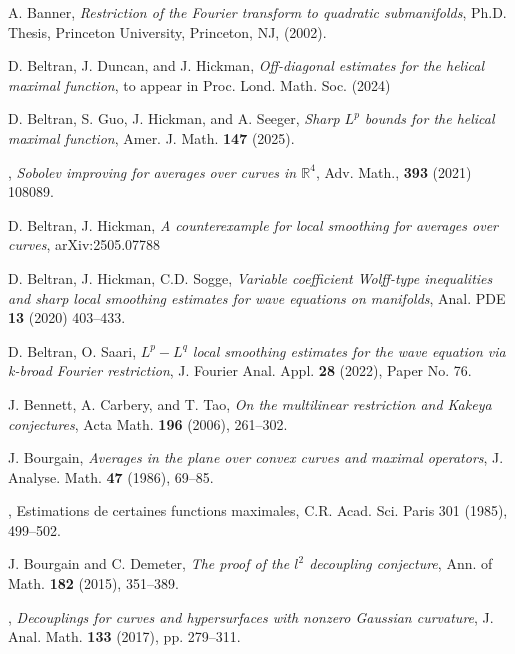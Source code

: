 \documentclass[10pt] %
{amsart}
\theoremstyle{plain}
\numberwithin{equation}{section}
\begin{document}

\begin{thebibliography}{}  


 A. Banner, \textit{Restriction of the Fourier transform to quadratic submanifolds}, Ph.D. Thesis, Princeton University, Princeton, NJ, (2002). 

 D. Beltran, J. Duncan, and J. Hickman, 
\textit{Off-diagonal estimates for the helical maximal function}, to appear in Proc. Lond. Math. Soc. (2024)  

 D. Beltran, S. Guo, J. Hickman, and A. Seeger,
\textit{Sharp $L^p$ bounds for the helical maximal function},
Amer. J. Math. \textbf{147} (2025).

 \bysame, \textit{Sobolev improving for averages over curves in $\mathbb R^4$}, Adv. Math., {\bf 393}  (2021)  108089.

 D. Beltran, J. Hickman, \textit{A counterexample for local smoothing for averages over curves}, arXiv:2505.07788


 D. Beltran, J. Hickman, C.D. Sogge, \textit{Variable coefficient Wolff-type inequalities and sharp local smoothing estimates for wave equations on manifolds}, Anal. PDE {\bf 13} (2020) 403--433.

 D. Beltran, O. Saari, \textit{$L^p-L^q$ local smoothing estimates for the wave equation via k-broad Fourier restriction}, J. Fourier Anal. Appl. \textbf{28} (2022), Paper No. 76.



 J. Bennett, A. Carbery, and T. Tao, \textit{On the multilinear restriction and Kakeya conjectures}, Acta Math. \textbf{196} (2006), 261--302.
	

	
 J. Bourgain, \textit{Averages in the plane over convex curves and maximal operators}, J. Analyse. Math. {\bf 47} (1986), 69--85.


		
 \bysame, Estimations de certaines functions maximales, C.R. Acad. Sci. Paris 301
(1985), 499--502.  

 J. Bourgain and C. Demeter, \textit{The proof of the $l^2$ decoupling conjecture},  Ann. of Math.  {\bf 182} (2015),  351--389.
		
 \bysame,  \textit{Decouplings for curves and hypersurfaces with nonzero
Gaussian curvature}, J. Anal. Math. \textbf{133} (2017), pp. 279--311.


\end{thebibliography}
\end{document}
